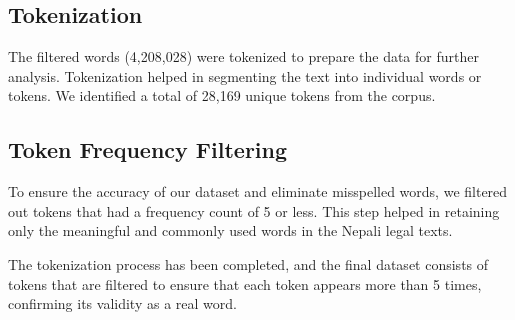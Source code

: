 \subsection{Tokenization}
The filtered words (4,208,028) were tokenized to prepare the data for further analysis. Tokenization helped in segmenting the text into individual words or tokens.
We identified a total of 28,169 unique tokens from the corpus.

\subsection{Token Frequency Filtering}
To ensure the accuracy of our dataset and eliminate misspelled words, we filtered out tokens that had a frequency count of 5 or less. This step helped in retaining only the meaningful and commonly used words in the Nepali legal texts.

The tokenization process has been completed, and the final dataset consists of tokens that are filtered to ensure that each token appears more than 5 times, confirming its validity as a real word.
